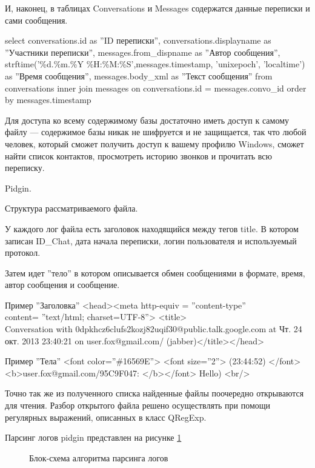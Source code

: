 И, наконец, в таблицах Conversations и Messages содержатся данные переписки и сами сообщения.

\noindent select conversations.id as ''ID переписки'', conversations.displayname as ''Участники переписки'', 
       messages.from\_dispname as ''Автор сообщения'',
       strftime('\%d.\%m.\%Y \%H:\%M:\%S',messages.timestamp, 'unixepoch', 'localtime') as ''Время сообщения'', 
       messages.body\_xml as ''Текст сообщения''
  from conversations
       inner join messages on conversations.id = messages.convo\_id
order by messages.timestamp

Для доступа ко всему содержимому базы достаточно иметь доступ к самому файлу — содержимое базы никак не шифруется и не защищается, так что любой человек, который сможет получить доступ к вашему профилю Windows, сможет найти список контактов, просмотреть историю звонков и прочитать всю переписку. 

Pidgin. 

Структура рассматриваемого файла. 

У каждого лог файла есть заголовок находящийся между тегов title. В котором записан ID\_Chat, дата начала переписки, логин пользователя и используемый протокол.

Затем идет ''тело'' в котором описывается обмен сообщениями в формате, время, автор сообщения и сообщение.

Пример ''Заголовка'' <head><meta http-equiv = ''content-type''\\ content= ''text/html; charset=UTF-8''> <title>\\ Conversation with 0dpkhcz6clufs2kozj82uqif30@public.talk.google.com at Чт. 24 окт. 2013 23:40:21 on user.fox@gmail.com/ (jabber)</title></head>

Пример ''Тела'' <font color=''\#16569E''> <font size=''2''> (23:44:52) </font> <b>user.fox@gmail.com/95C9F047: </b></font> Hello) <br/>

Точно так же из полученного списка найденные файлы поочередно открываются для чтения. Разбор открытого файла решено осуществлять при помощи регулярных выражений, описанных в класс QRegExp.

Парсинг логов pidgin представлен на рисунке \ref{pic:Pars_pidgin_log}

\begin{figure}[h]
\caption{Блок-схема алгоритма парсинга логов}
\label{pic:Pars_pidgin_log}
\end{figure}

